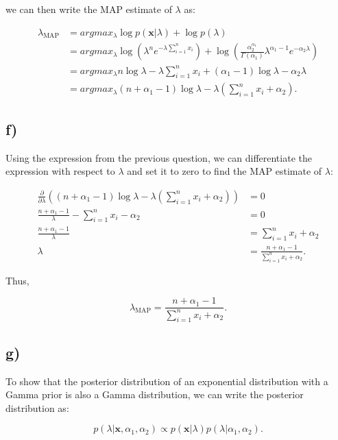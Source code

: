\documentclass[12pt,a4paper,oneside]{paper}
\begin{document}
we can then write the MAP estimate of \( \lambda \) as:

\begin{align*}
\lambda_{\text{MAP}} &= argmax_{\lambda} \log p(\mathbf{x} | \lambda) + \log p(\lambda) \\
&= argmax_{\lambda} \log \left( \lambda^n e^{-\lambda \sum_{i=1}^{n} x_i} \right) + \log \left( \frac{\alpha_2^{\alpha_1}}{\Gamma(\alpha_1)} \lambda^{\alpha_1 - 1} e^{-\alpha_2 \lambda} \right) \\
&= argmax_{\lambda} n \log \lambda - \lambda \sum_{i=1}^{n} x_i + (\alpha_1 - 1) \log \lambda - \alpha_2 \lambda \\
&= argmax_{\lambda} (n + \alpha_1 - 1) \log \lambda - \lambda \left( \sum_{i=1}^{n} x_i + \alpha_2 \right).
\end{align*}

\newpage
\subsection*{f)}

Using the expression from the previous question, we can differentiate the expression with respect to \( \lambda \) and set it to zero to find the MAP estimate of \( \lambda \):

\begin{align*}
\frac{\partial}{\partial \lambda} \left( (n + \alpha_1 - 1) \log \lambda - \lambda \left( \sum_{i=1}^{n} x_i + \alpha_2 \right) \right) &= 0 \\
\frac{n + \alpha_1 - 1}{\lambda} - \sum_{i=1}^{n} x_i - \alpha_2 &= 0 \\
\frac{n + \alpha_1 - 1}{\lambda} &= \sum_{i=1}^{n} x_i + \alpha_2 \\
\lambda &= \frac{n + \alpha_1 - 1}{\sum_{i=1}^{n} x_i + \alpha_2}.
\end{align*}

Thus, 

\[
\lambda_{\text{MAP}} = \frac{n + \alpha_1 - 1}{\sum_{i=1}^{n} x_i + \alpha_2}.
\]


\newpage
\subsection*{g)}

To show that the posterior distribution of an exponential distribution with a Gamma prior is also a Gamma distribution, we can write the posterior distribution as:

\[
p(\lambda | \mathbf{x}, \alpha_1, \alpha_2) \propto p(\mathbf{x} | \lambda) p(\lambda | \alpha_1, \alpha_2).
\]
\end{document}
